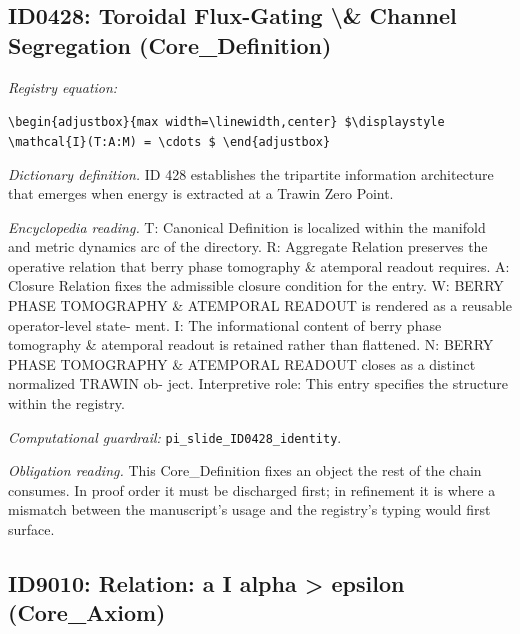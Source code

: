 \documentclass[11pt]{article}
\theoremstyle{remark}
\begin{document}
\subsection{ID0428: Toroidal Flux-Gating \textbackslash{}\& Channel Segregation (Core\_Definition)}

\noindent\textit{Registry equation:}\par
{\small\texttt{\textbackslash{}begin\{adjustbox\}\{max width=\textbackslash{}linewidth,center\} \$\textbackslash{}displaystyle \textbackslash{}mathcal\{I\}(T:A:M) = \textbackslash{}cdots \$ \textbackslash{}end\{adjustbox\}}}\par\medskip
\noindent\textit{Dictionary definition.} ID 428 establishes the tripartite information architecture that emerges when energy is extracted at a Trawin Zero Point.\par\medskip
\noindent\textit{Encyclopedia reading.} T: Canonical Definition is localized within the manifold and metric dynamics arc of the directory. R: Aggregate Relation preserves the operative relation that berry phase tomography \& atemporal readout requires. A: Closure Relation fixes the admissible closure condition for the entry. W: BERRY PHASE TOMOGRAPHY \& ATEMPORAL READOUT is rendered as a reusable operator-level state- ment. I: The informational content of berry phase tomography \& atemporal readout is retained rather than flattened. N: BERRY PHASE TOMOGRAPHY \& ATEMPORAL READOUT closes as a distinct normalized TRAWIN ob- ject. Interpretive role: This entry specifies the structure within the registry.
\par\medskip\noindent\textit{Computational guardrail:} \texttt{pi\_slide\_ID0428\_identity}.
\par\medskip\noindent\textit{Obligation reading.} This Core\_Definition fixes an object the rest of the chain consumes. In proof order it must be discharged first; in refinement it is where a mismatch between the manuscript's usage and the registry's typing would first surface.

\subsection{ID9010: Relation: a I alpha > epsilon (Core\_Axiom)}
\end{document}
